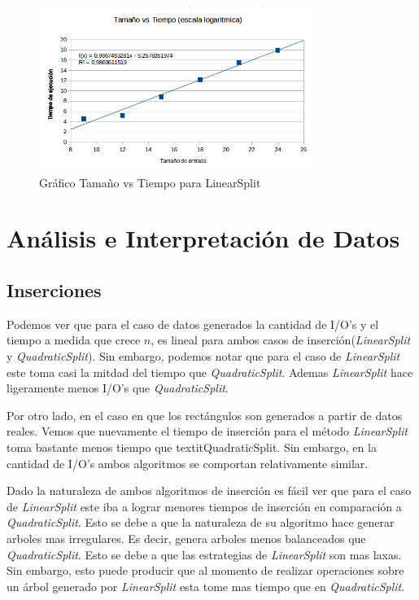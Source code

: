 \documentclass[letterpaper,12pt]{article}
\begin{document}
\begin{figure}[bp!]
  \centering
    \includegraphics[width=0.8\textwidth]{linear_tiempo}
  \caption{Gr\'afico Tama\~no vs Tiempo para LinearSplit}
  \label{fig:f4}
\end{figure}

\newpage
\section{An\'alisis e Interpretaci\'on de Datos}
 \subsection{Inserciones}
 
Podemos ver que para el caso de datos generados la cantidad de I/O's y el tiempo a medida que crece $n$, es lineal para ambos casos de inserción(\textit{LinearSplit} y \textit{QuadraticSplit}). Sin embargo, podemos notar que para el caso de \textit{LinearSplit} este toma casi la mitdad del tiempo que \textit{QuadraticSplit}. Ademas \textit{LinearSplit} hace ligeramente menos I/O's que \textit{QuadraticSplit}.

Por otro lado, en el caso en que los rectángulos son generados a partir de datos reales. Vemos que nuevamente el tiempo de inserción para el método \textit{LinearSplit} toma bastante menos tiempo que textit{QuadraticSplit}. Sin embargo, en la cantidad de I/O's ambos algoritmos se comportan relativamente similar.

Dado la naturaleza de ambos algoritmos de inserción es fácil ver que para el caso de \textit{LinearSplit} este iba a lograr menores tiempos de inserción en comparación a \textit{QuadraticSplit}. Esto se debe a que la naturaleza de su algoritmo hace generar arboles mas irregulares. Es decir, genera arboles menos balanceados que \textit{QuadraticSplit}. Esto se debe a que las estrategias de \textit{LinearSplit} son mas laxas. Sin embargo, esto puede producir que al momento de realizar operaciones sobre un árbol generado por \textit{LinearSplit} esta tome mas tiempo que en \textit{QuadraticSplit}.
\end{document}
